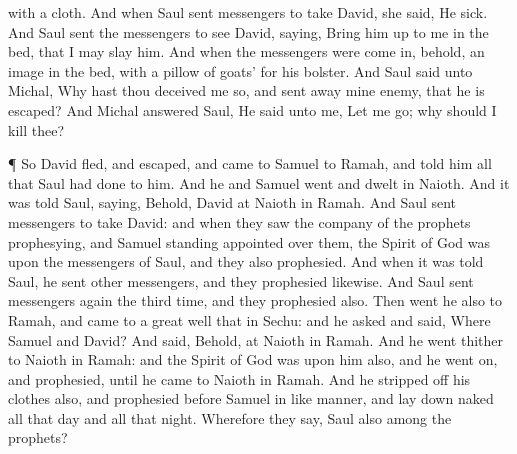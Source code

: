 {{} with a
cloth.
And when
Saul
sent
messengers to
take
David, she
said, He
{}
sick.
And
Saul
sent the
messengers
{} to
see
David,
saying, Bring him
up to me in the
bed, that I may
slay him.
And when the
messengers were come
in, behold,
{} an
image in the
bed, with a
pillow of
goats’
{} for his
bolster.
And
Saul
said unto
Michal, Why hast thou deceived me
so, and sent
away mine
enemy, that he is
escaped? And
Michal
answered
Saul, He
said unto me, Let me
go; why should I
kill thee?
\par }{\PP {}¶ So
David
fled, and
escaped, and
came to
Samuel to
Ramah, and
told him all that
Saul had
done to him. And he and
Samuel
went and
dwelt in
Naioth.
And it was
told
Saul,
saying, Behold,
David
{} at
Naioth in
Ramah.
And
Saul
sent
messengers to
take
David: and when they
saw the
company of the
prophets
prophesying, and
Samuel
standing
{}
appointed over them, the
Spirit of
God was upon the
messengers of
Saul, and they also
prophesied.
And when it was
told
Saul, he
sent
other
messengers, and they
prophesied likewise. And
Saul
sent
messengers
again the
third time, and they
prophesied also.
Then
went he also to
Ramah, and
came to a
great
well that
{} in
Sechu: and he
asked and
said,
Where
{}
Samuel and
David? And
{}
said, Behold,
{} at
Naioth in
Ramah.
And he
went thither to
Naioth in
Ramah: and the
Spirit of
God was upon him also, and he
went
on, and
prophesied, until he
came to
Naioth in
Ramah.
And he stripped
off his
clothes
also, and
prophesied
before
Samuel in like manner, and lay
down
naked all that
day and all that
night. Wherefore they
say,
{}
Saul also among the
prophets?

}
